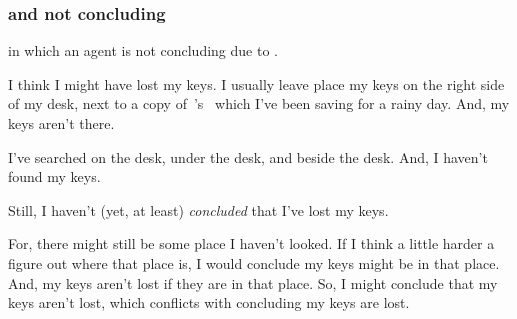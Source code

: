 \subsubsection{ and not concluding}

\begin{note}
   in which an agent is not concluding due to \requ{}.
\end{note}

\begin{note}
  \begin{illustration}
    \label{illu:lost-key}
    I think I might have lost my keys.
    I usually leave place my keys on the right side of my desk, next to a copy of~\citeauthor{Vickers:1989tr}'s~ which I've been saving for a rainy day.
    And, my keys aren't there.

    I've searched on the desk, under the desk, and beside the desk.
    And, I haven't found my keys.

    Still, I haven't (yet, at least) \emph{concluded} that I've lost my keys.

    For, there might still be some place I haven't looked.
    If I think a little harder a figure out where that place is, I would conclude my keys might be in that place.
    And, my keys aren't lost if they are in that place.
    So, I might conclude that my keys aren't lost, which conflicts with concluding my keys are lost.
  \end{illustration}
\end{note}

